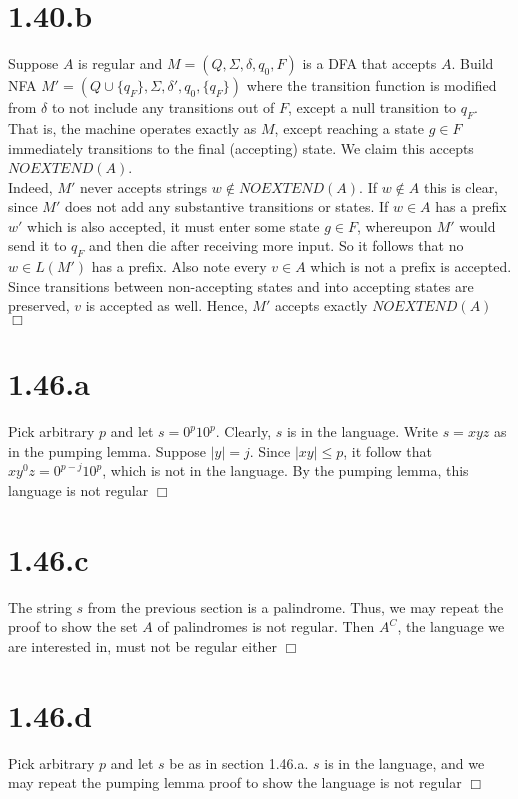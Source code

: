 \documentclass{article}
\begin{document}
\section*{1.40.b}
Suppose $A$ is regular and $M = (Q,\Sigma,\delta,q_0,F)$ is a DFA that accepts $A$. Build NFA $M' = (Q \cup \{q_F\}, \Sigma, \delta', q_0, \{q_F\})$ where the transition function is modified from $\delta$ to not include any transitions out of $F$, except a null transition to $q_F$. That is, the machine operates exactly as $M$, except reaching a state $g \in F$ immediately transitions to the final (accepting) state. We claim this accepts $NOEXTEND(A)$.\\
Indeed, $M'$ never accepts strings $w \notin NOEXTEND(A)$. If $w \notin A$ this is clear, since $M'$ does not add any substantive transitions or states. If $w \in A$ has a prefix $w'$ which is also accepted, it must enter some state $g \in F$, whereupon $M'$ would send it to $q_F$ and then die after receiving more input. So it follows that no $w \in L(M')$ has a prefix. Also note every $v \in A$ which is not a prefix is accepted. Since transitions between non-accepting states and into accepting states are preserved, $v$ is accepted as well. Hence, $M'$ accepts exactly $NOEXTEND(A)$ $\Box$

\section*{1.46.a}
Pick arbitrary $p$ and let $s = 0^p10^p$. Clearly, $s$ is in the language. Write $s = xyz$ as in the pumping lemma. Suppose $|y| = j$. Since $|xy| \leq p$, it follow that $xy^0z = 0^{p-j}10^p$, which is not in the language. By the pumping lemma, this language is not regular $\Box$

\section*{1.46.c}
The string $s$ from the previous section is a palindrome. Thus, we may repeat the proof to show the set $A$ of palindromes is not regular. Then $A^C$, the language we are interested in, must not be regular either $\Box$

\section*{1.46.d}
Pick arbitrary $p$ and let $s$ be as in section 1.46.a. $s$ is in the language, and we may repeat the pumping lemma proof to show the language is not regular $\Box$
\end{document}
